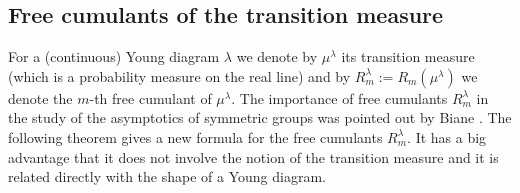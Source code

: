 \documentclass[12pt]{amsart}
\theoremstyle{plain}
\theoremstyle{remark}
\begin{document}


\subsection{Free cumulants of the transition measure}
\label{subsec:cumulants}

% 
% 
% 

For a (continuous) Young diagram $\lambda$ we denote by $\mu^{\lambda}$ its transition measure 
(which is a probability measure on the real line) \cite{Kerov1993,Biane1998} 
and by $R_{m}^{\lambda}:=R_m(\mu^{\lambda})$ we denote the $m$-th free cumulant of $\mu^{\lambda}$.
The importance of free cumulants $R_m^{\lambda}$ in the study of the asymptotics of symmetric groups 
was pointed out by Biane \cite{Biane1998}. 
The following theorem gives a new formula for the free cumulants
$R_m^{\lambda}$. It has a big advantage that it does not involve the notion of
the transition measure and it is related directly with the shape of a Young
diagram.
\end{document}
